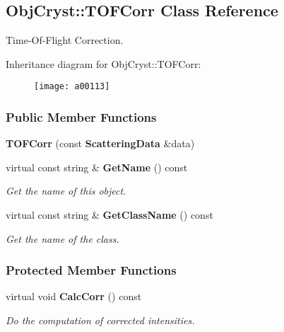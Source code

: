 \subsection{Obj\-Cryst\-:\-:T\-O\-F\-Corr Class Reference}
\label{a00113}


Time-\/\-Of-\/\-Flight Correction.  


Inheritance diagram for Obj\-Cryst\-:\-:T\-O\-F\-Corr\-:\begin{figure}[H]
\begin{center}
\leavevmode
\texttt{[image: a00113]}
\end{center}
\end{figure}
\subsubsection*{Public Member Functions}
\begin{DoxyCompactItemize}
\item 
{\bfseries T\-O\-F\-Corr} (const {\bf Scattering\-Data} \&data)\label{a00113_afceb96fa351306b6bb3ca787dc56d5fc}

\item 
virtual const string \& {\bf Get\-Name} () const \label{a00113_a6638348a144ef78b7d40448869c8c220}

\begin{DoxyCompactList}\small\item\em Get the name of this object. \end{DoxyCompactList}\item 
virtual const string \& {\bf Get\-Class\-Name} () const \label{a00113_a9eecdda6f5d0ae119334e54043d1d7d6}

\begin{DoxyCompactList}\small\item\em Get the name of the class. \end{DoxyCompactList}\end{DoxyCompactItemize}
\subsubsection*{Protected Member Functions}
\begin{DoxyCompactItemize}
\item 
virtual void {\bf Calc\-Corr} () const \label{a00113_ae0a0c31d2edc029708722f00e05a5edf}

\begin{DoxyCompactList}\small\item\em Do the computation of corrected intensities. \end{DoxyCompactList}\end{DoxyCompactItemize}
